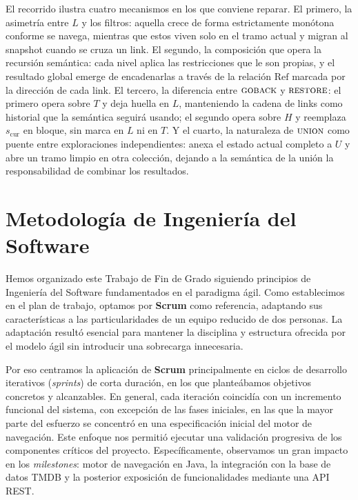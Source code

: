 El recorrido ilustra cuatro mecanismos en los que conviene reparar. El primero, la asimetría entre $L$ y los
filtros: aquella crece de forma estrictamente monótona conforme se navega, mientras que estos viven solo en
el tramo actual y migran al snapshot cuando se cruza un link. El segundo, la composición que opera la
recursión semántica: cada nivel aplica las restricciones que le son propias, y el resultado global emerge de
encadenarlas a través de la relación $\mathrm{Ref}$ marcada por la dirección de cada link. El tercero, la
diferencia entre $\textsc{goback}$ y $\textsc{restore}$: el primero opera sobre $T$ y deja huella en $L$,
manteniendo la cadena de links como historial que la semántica seguirá usando; el segundo opera sobre $H$ y
reemplaza $s_{\text{cur}}$ en bloque, sin marca en $L$ ni en $T$. Y el cuarto, la naturaleza de
$\textsc{union}$ como puente entre exploraciones independientes: anexa el estado actual completo a $U$ y
abre un tramo limpio en otra colección, dejando a la semántica de la unión la responsabilidad de combinar
los resultados.

\section{Metodología de Ingeniería del Software}

Hemos organizado este Trabajo de Fin de Grado siguiendo principios de Ingeniería del Software fundamentados en el paradigma ágil.
Como establecimos en el plan de trabajo, optamos por \textbf{Scrum} \citep{hanser2026scrum} como referencia, adaptando sus características
a las particularidades de un equipo reducido de dos personas. La adaptación resultó esencial para mantener la
disciplina y estructura ofrecida por el modelo ágil sin introducir una sobrecarga innecesaria.

Por eso centramos la aplicación de \textbf{Scrum} principalmente en ciclos de desarrollo iterativos (\textit{sprints})
de corta duración, en los que planteábamos objetivos concretos y alcanzables. En general, cada iteración coincidía con un
incremento funcional del sistema, con excepción de las fases iniciales, en las que la mayor parte del esfuerzo se concentró
en una especificación inicial del motor de navegación. Este enfoque nos permitió ejecutar una validación progresiva de los componentes
críticos del proyecto. Específicamente, observamos un gran impacto en los \textit{milestones}: motor de
navegación en Java, la integración con la base de datos TMDB y la posterior exposición de funcionalidades
mediante una API REST.

